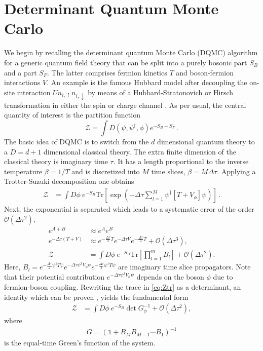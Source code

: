 \documentclass[submission, Phys]{SciPost}
\begin{document}
\section{Determinant Quantum Monte Carlo}\label{sec:QMC}

We begin by recalling the determinant quantum Monte Carlo (DQMC) algorithm \cite{Blankenbecler1981} for a generic quantum field theory that can be split into a purely bosonic part $S_B$ and a part $S_F$. The latter comprises fermion kinetics $T$ and boson-fermion interactions $V$. An example is the famous Hubbard model after decoupling the on-site
interaction $U n_{i, \uparrow} n_{i, \downarrow}$ by means of a Hubbard-Stratonovich or Hirsch transformation in either the spin or charge channel \cite{Hirsch1983}. As per usual, the central quantity of interest is the partition function
%
\begin{equation}
\mathcal{Z} = \int D\left( \psi, \psi^\dagger, \phi \right) e^{-S_B - S_F} \,.
\end{equation}
%
The basic idea of DQMC is to switch from the $d$ dimensional quantum theory to a $D = d + 1$ dimensional classical theory. The extra finite dimension of the classical theory is imaginary time $\tau$. It has a length proportional to the inverse temperature $\beta = 1/T$ and is discretized into $M$ time slices, $\beta = M \Delta \tau$. Applying a Trotter-Suzuki decomposition \cite{Trotter1959, Suzuki1986} one obtains
%
\begin{align}
	\mathcal{Z} &= \int D\phi \ e^{-S_B} \mathrm{Tr}{\left[\exp{\left( -\Delta\tau \sum_{l=1}^M \psi^\dagger \left[T + V_\phi\right] \psi \right)}\right]} \label{eq:discretizedpi} \,.
\end{align}
%
Next, the exponential is separated which leads to a systematic error of the order $\mathcal{O}\left(\Delta\tau^2\right)$,
\begin{align}
	e^{A + B} &\approx e^A e^B \quad \nonumber\\
	e^{-\Delta\tau (T + V)} &\approx e^{- \frac{\Delta\tau}{2}T} e^{-\Delta\tau V} e^{- \frac{\Delta\tau}{2}T} + \mathcal{O}\left(\Delta\tau^3\right), \nonumber\\
	\mathcal{Z} &= \int D\phi \ e^{-S_B} \mathrm{Tr}{\left[ \prod_{l=1}^{m} B_l \right]} + \mathcal{O}\left(\Delta\tau^2\right). \label{eq:Ztr}
\end{align}
%
Here, $B_l = e^{- \frac{\Delta\tau}{2}\psi^\dagger T \psi} e^{-\Delta\tau \psi^\dagger V_\phi \psi} e^{- \frac{\Delta\tau}{2}\psi^\dagger T \psi}$ are imaginary time slice propagators. Note that their potential contribution $e^{-\Delta\tau \psi^\dagger V_\phi \psi}$ depends on the boson $\phi$ due to fermion-boson coupling. Rewriting the trace in \eqref{eq:Ztr} as a determinant, an identity which can be proven \cite{Assaad2002a}, yields the fundamental form
%
\begin{align}
	\mathcal{Z} &= \int D\phi \ e^{-S_B} \det{G_\phi^{-1}} + \mathcal{O}\left(\Delta\tau^2\right), \label{eq:DQMC}
\end{align}
%
where
\begin{align}
	G = \left( \mathbb{1} + B_M B_{M-1} \cdots B_1 \right)^{-1} \label{etgf}
\end{align}
is the equal-time Green's function of the system.
\end{document}
